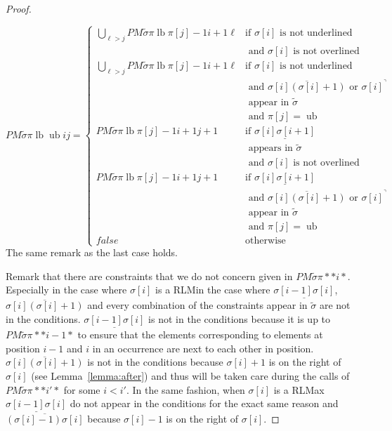 \documentclass[a4paper]{llncs}
\newcommand{\ptext}{\pi}
\newcommand{\ppattern}{\sigma}
\newcommand{\PM}{PM}
\DeclareMathOperator{\lb}{lb}
\DeclareMathOperator{\ub}{ub}
\begin{document}
\begin{proof}
\begin{itemize}
	$$
	\PM{\widetilde{\sigma}}{\ptext}{\lb}{\ub}{i}{j}=
	\begin{cases}
			\bigcup_{\ell>j} \PM{\widetilde{\sigma}}{\ptext}{\lb}{\ptext[j]-1}{i+1}{\ell}
				& \text{if $\ppattern[i]$ is not underlined } \\
				& \text{ and $\ppattern[i]$ is not overlined} \\
			\bigcup_{\ell>j} \PM{\widetilde{\sigma}}{\ptext}{\lb}{\ptext[j]-1}{i+1}{\ell}
				& \text{if $\ppattern[i]$ is not underlined } \\
				& \text{ and $\overline{\ppattern[i](\ppattern[i]+1)}$ or ${\ppattern[i]}^\urcorner$}\\
				& \text{ appear in $\widetilde{\sigma}$}\\
				& \text{ and $\ptext[j]=\ub$} \\
			\PM{\widetilde{\sigma}}{\ptext}{\lb}{\ptext[j]-1}{i+1}{j+1}
				& \text{if $\underline{\ppattern[i]\ppattern[i+1]}$ } \\
				& \text{ appears in $\widetilde{\sigma}$}\\
				& \text{ and $\ppattern[i]$ is not overlined} \\
			\PM{\widetilde{\sigma}}{\ptext}{\lb}{\ptext[j]-1}{i+1}{j+1}
				& \text{if $\underline{\ppattern[i]\ppattern[i+1]}$ } \\
				& \text{ and $\overline{\ppattern[i](\ppattern[i]+1)}$ or ${\ppattern[i]}^\urcorner$}\\
				& \text{ appear in $\widetilde{\sigma}$}\\
				& \text{ and $\ptext[j]=\ub$} \\
			false & \text{otherwise}
	\end{cases}
	$$
	The same remark as the last case holds.
\end{itemize}

Remark that there are constraints that we do not concern given in
$\PM{\widetilde{\sigma}}{\ptext}{*}{*}{i}{*}$.
Especially in the case where $\sigma[i]$ is a RLMin
the case where $\underline{\sigma[i-1]\sigma[i]}$,
$\overline{\ppattern[i](\ppattern[i]+1)}$
and every combination of the constraints
appear in $\widetilde{\sigma}$
are not in the conditions.
$\underline{\sigma[i-1]\sigma[i]}$ is not
in the conditions because it is
up to $\PM{\widetilde{\sigma}}{\ptext}{*}{*}{i-1}{*}$
to ensure that the elements corresponding to elements at position $i-1$ and $i$ in an occurrence are next to each other in position.
$\overline{\ppattern[i](\ppattern[i]+1)}$ is not
in the conditions because $\sigma[i]+1$ is on the right
of $\sigma[i]$ (see Lemma~\ref{lemma:after})
and thus will
be taken care
during the calls of $\PM{\widetilde{\sigma}}{\ptext}{*}{*}{i'}{*}$
for some $i<i'$.
In the same fashion,
when $\sigma[i]$ is a RLMax $\underline{\sigma[i-1]\sigma[i]}$
do not appear in the conditions for the exact same reason
and $\overline{(\ppattern[i]-1)\ppattern[i]}$
because $\sigma[i]-1$ is on the right of $\sigma[i]$.


\end{proof}
\end{document}
